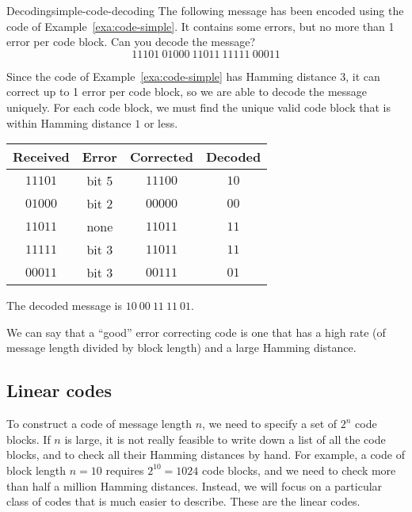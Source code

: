\begin{example}{Decoding}{simple-code-decoding}
  The following message has been encoded using the code of
  Example~\ref{exa:code-simple}. It contains some errors, but no more
  than 1 error per code block. Can you decode the message?
  \begin{equation*}
    11101~01000~11011~11111~00011
  \end{equation*}
\end{example}

\begin{solution}
  Since the code of Example~\ref{exa:code-simple} has Hamming distance
  $3$, it can correct up to 1 error per code block, so we are able to
  decode the message uniquely. For each code block, we must find the
  unique valid code block that is within Hamming distance $1$ or less.
  \begin{center}
    \begin{tabular}{|c|c|c|c|}
      \hline
      Received & Error & Corrected & Decoded \\\hline
      $11101$  & bit 5 & $11100$   & $10$    \\
      $01000$  & bit 2 & $00000$   & $00$    \\
      $11011$  & none  & $11011$   & $11$    \\
      $11111$  & bit 3 & $11011$   & $11$    \\
      $00011$  & bit 3 & $00111$   & $01$    \\
      \hline
    \end{tabular}
  \end{center}
  The decoded message is $10~00~11~11~01$.
\end{solution}

We can say that a ``good'' error correcting code is one that has a
high rate (of message length divided by block length) and a large
Hamming distance.

\subsection*{Linear codes}

To construct a code of message length $n$, we need to specify a set of
$2^n$ code blocks. If $n$ is large, it is not really feasible to write
down a list of all the code blocks, and to check all their Hamming
distances by hand. For example, a code of block length $n=10$ requires
$2^{10}=1024$ code blocks, and we need to check more than half a
million Hamming distances. Instead, we will focus on a particular
class of codes that is much easier to describe. These are the linear
codes.

